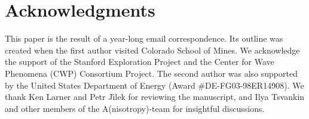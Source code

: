 
\section{Acknowledgments}
This paper is the result of a year-long email correspondence. Its
outline was created when the first author visited Colorado
School of Mines.  We acknowledge the support of the Stanford
Exploration Project and the Center for Wave Phenomena (CWP) Consortium
Project. The second author was also supported by the United States
Department of Energy (Award \#DE-FG03-98ER14908). We thank Ken Larner
and Petr J\'{\i}lek for reviewing the manuscript, and Ilya Tsvankin 
and other members of the A(nisotropy)-team for insightful discussions.

